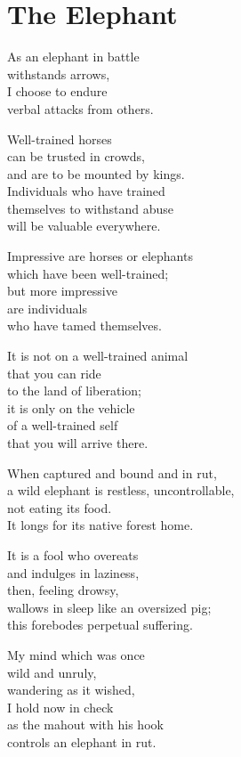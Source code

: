 
\chapter{The Elephant}


As an elephant in battle\\
withstands arrows,\\
I choose to endure\\
verbal attacks from others.


Well-trained horses\\
can be trusted in crowds,\\
and are to be mounted by kings.\\
Individuals who have trained\\
themselves to withstand abuse\\
will be valuable everywhere.


Impressive are horses or elephants\\
which have been well-trained;\\
but more impressive\\
are individuals\\
who have tamed themselves.


It is not on a well-trained animal\\
that you can ride\\
to the land of liberation;\\
it is only on the vehicle\\
of a well-trained self\\
that you will arrive there.


When captured and bound and in rut,\\
a wild elephant is restless, uncontrollable,\\
not eating its food.\\
It longs for its native forest home.


It is a fool who overeats\\
and indulges in laziness,\\
then, feeling drowsy,\\
wallows in sleep like an oversized pig;\\
this forebodes perpetual suffering.


My mind which was once\\
wild and unruly,\\
wandering as it wished,\\
I hold now in check\\
as the mahout with his hook\\
controls an elephant in rut.


